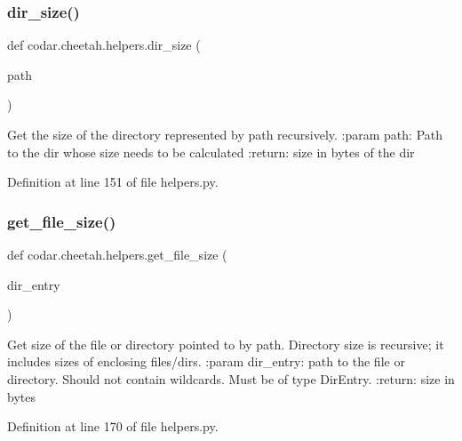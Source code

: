 \subsubsection{\texorpdfstring{dir\+\_\+size()}{dir\_size()}}
{\footnotesize\ttfamily def codar.\+cheetah.\+helpers.\+dir\+\_\+size (\begin{DoxyParamCaption}\item[{}]{path }\end{DoxyParamCaption})}

\begin{DoxyVerb}Get the size of the directory represented by path recursively.
:param path: Path to the dir whose size needs to be calculated
:return: size in bytes of the dir
\end{DoxyVerb}
 

Definition at line 151 of file helpers.\+py.

\mbox{\label{namespacecodar_1_1cheetah_1_1helpers_a8e310d521f50d49d9c9732da40b62b07}} 
\subsubsection{\texorpdfstring{get\+\_\+file\+\_\+size()}{get\_file\_size()}}
{\footnotesize\ttfamily def codar.\+cheetah.\+helpers.\+get\+\_\+file\+\_\+size (\begin{DoxyParamCaption}\item[{}]{dir\+\_\+entry }\end{DoxyParamCaption})}

\begin{DoxyVerb}Get size of the file or directory pointed to by path.
Directory size is recursive; it includes sizes of enclosing files/dirs.
:param dir_entry: path to the file or directory. Should not contain wildcards.
                  Must be of type DirEntry.
:return: size in bytes
\end{DoxyVerb}
 

Definition at line 170 of file helpers.\+py.

\mbox{\label{namespacecodar_1_1cheetah_1_1helpers_a8b3cf1f795749b30693bde31033207e6}} 
